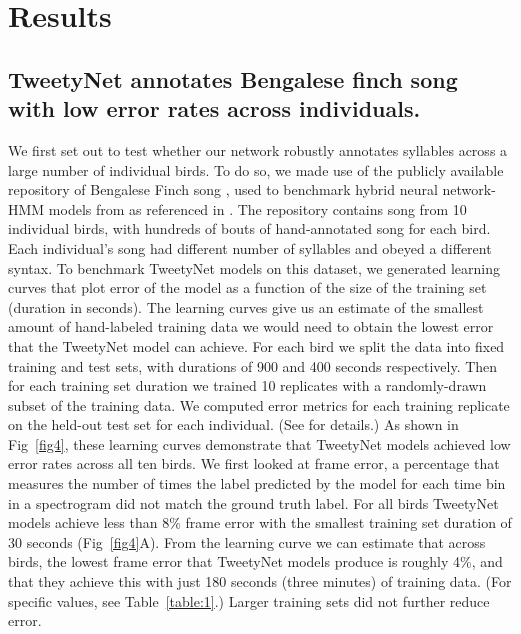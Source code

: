 \documentclass[10pt,letterpaper]{article}
\begin{document}
\section*{Results}
\label{Results}

\subsection*{TweetyNet annotates Bengalese finch song with low error rates across individuals.}
We first set out to test whether our network robustly annotates syllables across a large number of
individual birds. To do so, we made use of the  
publicly available repository of Bengalese Finch song \cite{koumura_birdsongrecognition_2016},
used to benchmark hybrid neural network-HMM models from \cite{koumura_automatic_2016-1} 
as referenced in . 
The repository contains song from 10 individual birds, with hundreds of bouts of hand-annotated 
song for each bird. Each individual's song had different number of syllables and obeyed a different syntax.
To benchmark TweetyNet models on this dataset, we generated learning curves that plot error of the 
model as a function of the size of the training set (duration in seconds). 
The learning curves give us an estimate of the smallest amount of hand-labeled training data 
we would need to obtain the lowest error that the TweetyNet model can achieve.
For each bird we split the data into fixed training and test sets, 
with durations of 900 and 400 seconds respectively.
Then for each training set duration we trained 10
replicates with a randomly-drawn subset of the training data. 
We computed error metrics for each training replicate on the 
held-out test set for each individual. (See  for details.)
As shown in Fig~\ref{fig4}, these learning curves 
demonstrate that TweetyNet models achieved low error rates across all ten birds.
We first looked at frame error, a percentage that measures the number of times the label 
predicted by the model for each time bin in a spectrogram 
did not match the ground truth label.
For all birds %
TweetyNet models achieve less than 8\% frame error with the smallest training set duration 
of 30 seconds (Fig~\ref{fig4}A). 
From the learning curve we can estimate that across birds, the lowest frame error 
that TweetyNet models produce is roughly 4\%, and that they achieve this with just 
180 seconds (three minutes) of training data. (For specific values, see Table~\ref{table:1}.)
Larger training sets did not further reduce error.
\end{document}
